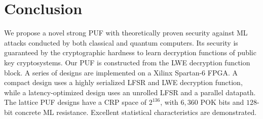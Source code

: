 \section{Conclusion}
\label{sec:conclusion}

We propose a novel strong PUF with theoretically proven security against ML attacks conducted by both classical and quantum computers. Its security is guaranteed by the cryptographic hardness to learn decryption functions of public key cryptosystems. Our PUF is constructed from the LWE decryption function block. A series of designs are implemented on a Xilinx Spartan-6 FPGA. A compact design uses a highly serialized LFSR and LWE decryption function, while a latency-optimized design uses an unrolled LFSR and a parallel datapath. The lattice PUF designs have a CRP space of $2^{136}$, with $6,360$ POK bits and $128$-bit concrete ML resistance. Excellent statistical characteristics are demonstrated.   